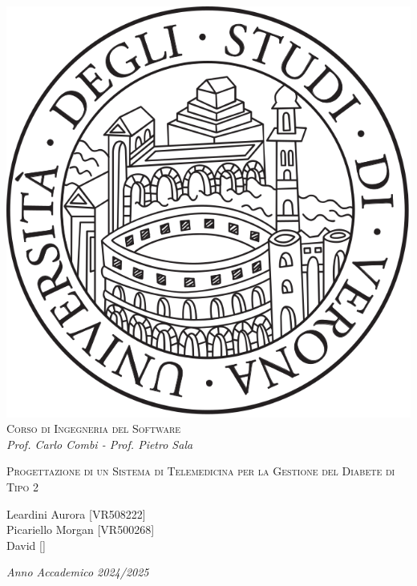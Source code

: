 \begin{titlepage}
\begin{center}
\begin{spacing}{1.5}
\includegraphics[width=.2\textwidth, height=.2\textheight, keepaspectratio]{figures/verona.png}\\
{{\Large{\textsc{Corso di Ingegneria del Software}}}}\\
{\large{\it Prof. Carlo Combi - Prof. Pietro Sala}}
\end{spacing}
\end{center}
\vspace{15mm}
\begin{center}
\begin{spacing}{1.5}

{\large }

{\LARGE{\textsc{Progettazione di un Sistema di Telemedicina per la Gestione del Diabete di Tipo 2}}}\\
\begin{center}
\vspace{35mm}
{\large{\textsc Leardini Aurora [VR508222] \\Picariello Morgan [VR500268]}} \\ David []
\end{center}
\end{spacing}
\end{center}
\par
\noindent
\vspace{45mm}
\begin{center}
{\large{\it Anno Accademico 2024/2025 }}
\end{center}
\end{titlepage}
